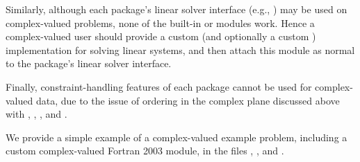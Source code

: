 Similarly, although each package's linear solver interface (e.g.,
{\cvls}) may be used on complex-valued problems, none of the built-in
{\sunmatrix} or {\sunlinsol} modules work.  Hence a complex-valued
user should provide a custom {\sunlinsol} (and optionally a custom
{\sunmatrix}) implementation for solving linear systems, and then
attach this module as normal to the package's linear solver
interface.

Finally, constraint-handling features of each package cannot be used
for complex-valued data, due to the issue of
ordering in the complex plane discussed above with
, , ,
 and .

We provide a simple example of a complex-valued example problem,
including a custom complex-valued Fortran 2003 {\nvector} module, in the
files
\newline\noindent{},
\newline\noindent{}, and
\newline\noindent{}.
